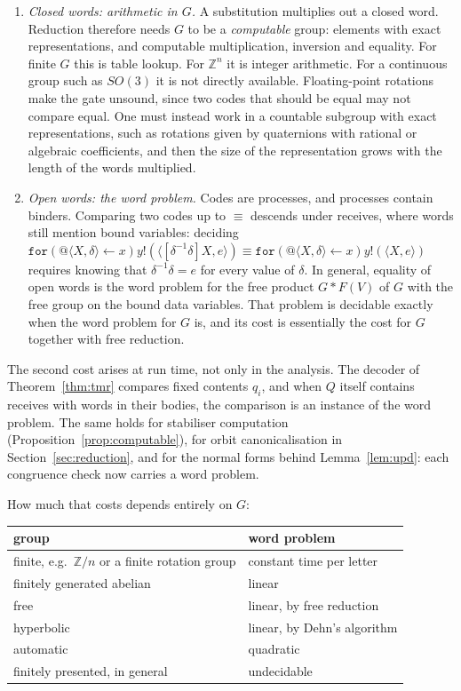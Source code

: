\documentclass[11pt]{article}
\makeatletter
\theoremstyle{definition}
\theoremstyle{remark}
\newcommand{\rcv}[3]{\mathtt{for}(#1 \leftarrow #2)#3}
\newcommand{\out}[3]{#1!(\langle #2, #3\rangle)}
\newcommand{\qn}[2]{@\langle #1, #2\rangle}
\newcommand{\scong}{\equiv}
\newcommand{\fr}[2]{[#1]#2}
\makeatother
\begin{document}
\begin{enumerate}[leftmargin=1.5em]
\item \emph{Closed words: arithmetic in $G$.} A substitution multiplies out a
  closed word. Reduction therefore needs $G$ to be a \emph{computable} group:
  elements with exact representations, and computable multiplication,
  inversion and equality. For finite $G$ this is table lookup. For
  $\mathbb{Z}^n$ it is integer arithmetic. For a continuous group such as
  $SO(3)$ it is not directly available. Floating-point rotations make the gate
  unsound, since two codes that should be equal may not compare equal. One must
  instead work in a countable subgroup with exact representations, such as
  rotations given by quaternions with rational or algebraic coefficients, and
  then the size of the representation grows with the length of the words
  multiplied.
\item \emph{Open words: the word problem.} Codes are processes, and processes
  contain binders. Comparing two codes up to $\scong$ descends under receives,
  where words still mention bound variables: deciding
  $\rcv{\qn{X}{\delta}}{x}{\out{y}{\fr{\delta^{-1}\delta}{X}}{e}}\scong
  \rcv{\qn{X}{\delta}}{x}{\out{y}{X}{e}}$ requires knowing that
  $\delta^{-1}\delta=e$ for every value of $\delta$. In general, equality of
  open words is the word problem for the free product $G*F(V)$ of $G$ with the
  free group on the bound data variables. That problem is decidable exactly
  when the word problem for $G$ is, and its cost is essentially the cost for
  $G$ together with free reduction.
\end{enumerate}

The second cost arises at run time, not only in the analysis. The decoder of
Theorem~\ref{thm:tmr} compares fixed contents $q_i$, and when $Q$ itself
contains receives with words in their bodies, the comparison is an instance of
the word problem. The same holds for stabiliser computation
(Proposition~\ref{prop:computable}), for orbit canonicalisation in
Section~\ref{sec:reduction}, and for the normal forms behind
Lemma~\ref{lem:upd}: each congruence check now carries a word problem.

How much that costs depends entirely on $G$:

\begin{center}
\begin{tabular}{@{}ll@{}}
\toprule
group & word problem\\
\midrule
finite, e.g.\ $\mathbb{Z}/n$ or a finite rotation group & constant time per
  letter\\
finitely generated abelian & linear\\
free & linear, by free reduction\\
hyperbolic & linear, by Dehn's algorithm\\
automatic & quadratic~\cite{epstein}\\
finitely presented, in general & undecidable~\cite{novikov,boone}\\
\bottomrule
\end{tabular}
\end{center}
\end{document}
